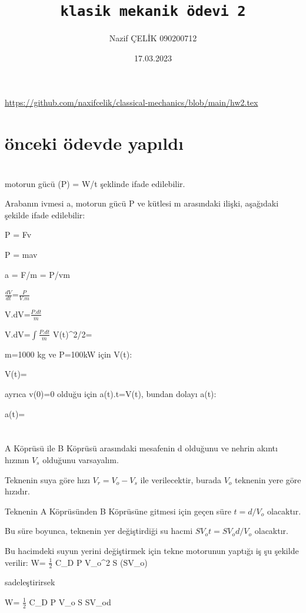 \documentclass[12pt]{article}
\title{ \texttt{klasik mekanik ödevi 2}}
\author{Nazif ÇELİK 090200712}
\date{17.03.2023}
\begin{document}
\maketitle
\href{url}{https://github.com/naxifcelik/classical-mechanics/blob/main/hw2.tex}
\section{önceki ödevde yapıldı}
\newpage
\section{}
motorun gücü (P) = W/t şeklinde ifade edilebilir.

Arabanın ivmesi a, motorun gücü P ve kütlesi m arasındaki ilişki, aşağıdaki şekilde ifade edilebilir:

P = Fv

P = mav

a = F/m = P/vm

$\frac{dV}{dt}$=$\frac{P}{V.m}$

V.dV=$\frac{P.dt}{m}$

\int V.dV=$\int \frac{P.dt}{m}$
\bigbreak
V(t)^2/2=

m=1000 kg ve P=100kW için V(t):

V(t)=

 ayrıca v(0)=0 olduğu için a(t).t=V(t), bundan dolayı a(t):
 
 a(t)=

 
\newpage
\section{}
A Köprüsü ile B Köprüsü arasındaki mesafenin d olduğunu ve nehrin akıntı hızının $V_s$ olduğunu varsayalım. 

Teknenin suya göre hızı  $V_r = V_o - V_s$ ile verilecektir, burada $V_o$ teknenin yere göre hızıdır.

Teknenin A Köprüsünden B Köprüsüne gitmesi için geçen süre $t = d / V_o$ olacaktır.

Bu süre boyunca, teknenin yer değiştirdiği su hacmi $SV_ot = SV_od / V_o$ olacaktır. 

Bu hacimdeki suyun yerini değiştirmek için tekne motorunun yaptığı iş şu şekilde verilir:
\bigbreak
W= $\frac{1}{2}$ \times C_D \times P \times V_o^2 \times S \times (SV_o)

sadeleştirirsek

W= $\frac{1}{2}$ \times C_D \times P \times V_o \times S \times SV_od
\end{document}
